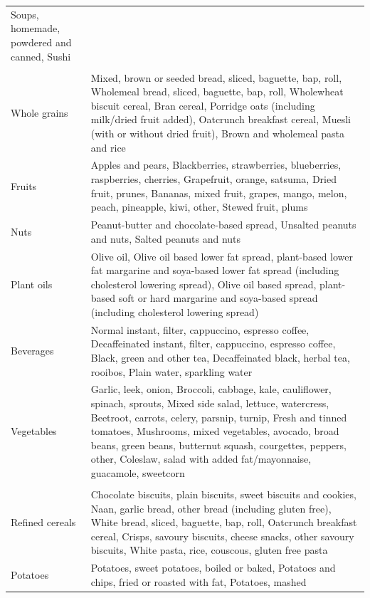 \documentclass[sn-basic,Numbered,pdflatex]{sn-jnl}
\begin{document}
\begin{longtable}{@{\extracolsep{\fill}}>{\raggedright\arraybackslash}p{}>{\raggedright\arraybackslash}p{}}
  Soups, homemade, powdered and canned, Sushi \\ 
{\bfseries Healthy plant-based foods} &   \\ 
Whole grains & Mixed, brown or seeded bread, sliced, baguette, bap, roll, Wholemeal bread, sliced, baguette, bap, roll,
  Wholewheat biscuit cereal, Bran cereal, Porridge oats (including milk/dried fruit added),
  Oatcrunch breakfast cereal, Muesli (with or without dried fruit), Brown and wholemeal pasta and rice \\ 
Fruits & Apples and pears, Blackberries, strawberries, blueberries, raspberries, cherries, Grapefruit, orange, satsuma,
  Dried fruit, prunes, Bananas, mixed fruit, grapes, mango, melon, peach, pineapple, kiwi, other, Stewed fruit, plums \\ 
Nuts & Peanut-butter and chocolate-based spread, Unsalted peanuts and nuts, Salted peanuts and nuts \\ 
Plant oils & Olive oil, Olive oil based lower fat spread, plant-based lower fat margarine and soya-based lower fat spread (including cholesterol lowering spread),
  Olive oil based spread, plant-based soft or hard margarine and soya-based spread (including cholesterol lowering spread) \\ 
Beverages & Normal instant, filter, cappuccino, espresso coffee, Decaffeinated instant, filter, cappuccino, espresso coffee,
  Black, green and other tea, Decaffeinated black, herbal tea, rooibos, Plain water, sparkling water \\ 
Vegetables & Garlic, leek, onion, Broccoli, cabbage, kale, cauliflower, spinach, sprouts, Mixed side salad, lettuce, watercress,
  Beetroot, carrots, celery, parsnip, turnip, Fresh and tinned tomatoes,
  Mushrooms, mixed vegetables, avocado, broad beans, green beans, butternut squash, courgettes, peppers, other,
  Coleslaw, salad with added fat/mayonnaise, guacamole, sweetcorn \\ 
{\bfseries Unhealthy plant-based foods} &   \\ 
Refined cereals & Chocolate biscuits, plain biscuits, sweet biscuits and cookies, Naan, garlic bread, other bread (including gluten free),
  White bread, sliced, baguette, bap, roll, Oatcrunch breakfast cereal, Crisps, savoury biscuits, cheese snacks, other savoury biscuits,
  White pasta, rice, couscous, gluten free pasta \\ 
Potatoes & Potatoes, sweet potatoes, boiled or baked, Potatoes and chips, fried or roasted with fat, Potatoes, mashed \\ 

\end{longtable}
\end{document}
